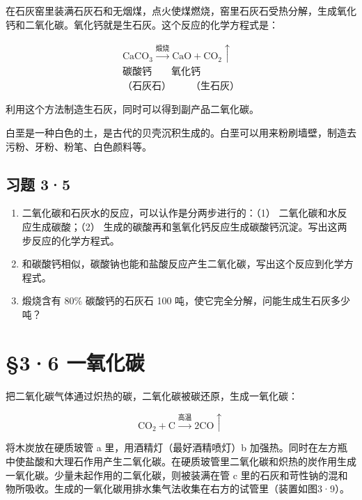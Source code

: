 在石灰窑里装满石灰石和无烟煤，点火使煤燃烧，窑里石灰石受热分解，生成氧化钙和二氧化碳。氧化钙就是生石灰。这个反应的化学方程式是：

\[
\begin{array}{l}\mathrm{CaCO}_{3}\xrightarrow{\text{煅烧}}\mathrm{CaO}+\mathrm{CO}_{2}\uparrow\\\text{碳酸钙}\qquad\text{氧化钙}\\\text{（石灰石）}\qquad\text{（生石灰）}\end{array}
\]

利用这个方法制造生石灰，同时可以得到副产品二氧化碳。

白垩是一种白色的土，是古代的贝壳沉积生成的。白垩可以用来粉刷墙壁，制造去污粉、牙粉、粉笔、白色颜料等。

\subsection{习题 3·5}

\begin{enumerate}
\item
  二氧化碳和石灰水的反应，可以认作是分两步进行的：（1）
  二氧化碳和水反应生成碳酸；（2）
  生成的碳酸再和氢氧化钙反应生成碳酸钙沉淀。写出这两步反应的化学方程式。
\item
  和碳酸钙相似，碳酸钠也能和盐酸反应产生二氧化碳，写出这个反应到化学方程式。
\item
  煅烧含有 80\% 碳酸钙的石灰石 100
  吨，使它完全分解，问能生成生石灰多少吨？
\end{enumerate}

\section{§3·6 一氧化碳}

把二氧化碳气体通过炽热的碳，二氧化碳被碳还原，生成一氧化碳：

\[
\mathrm{CO}_{2} + \mathrm{C} \xrightarrow {\text{高温}} 2 \mathrm{CO} \uparrow
\]

将木炭放在硬质玻管 a 里，用酒精灯（最好酒精喷灯）b
加强热。同时在左方瓶中使盐酸和大理石作用产生二氧化碳。在硬质玻管里二氧化碳和炽热的炭作用生成一氧化碳。少量未起作用的二氧化碳，则被装满在管
c
里的石灰和苛性钠的混和物所吸收。生成的一氧化碳用排水集气法收集在右方的试管里（装置如图3·9）。

